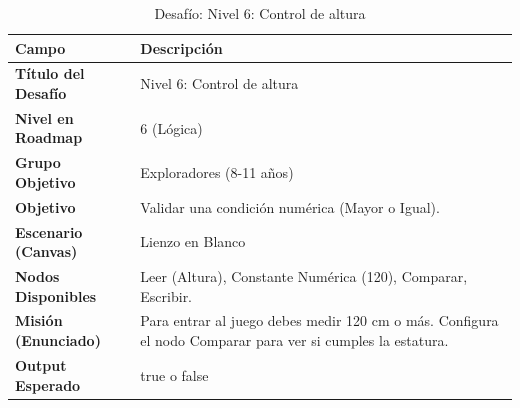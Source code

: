 \begin{table}[H]
    \centering
    \caption{Desafío: Nivel 6: Control de altura}
    \label{tab:desafio-exp-6}
    \begingroup
    \renewcommand{\arraystretch}{\TableRowStretch}
    \begin{tabularx}{\textwidth}{ l X }
        \hline
        \textbf{Campo}              & \textbf{Descripción}                                                                                       \\
        \hline
        \textbf{Título del Desafío} & Nivel 6: Control de altura                                                                                 \\
        \textbf{Nivel en Roadmap}   & 6 (Lógica)                                                                                                 \\
        \textbf{Grupo Objetivo}     & Exploradores (8-11 años)                                                                                   \\
        \textbf{Objetivo}           & Validar una condición numérica (Mayor o Igual).                                                            \\
        \textbf{Escenario (Canvas)} & Lienzo en Blanco                                                                                           \\
        \textbf{Nodos Disponibles}  & Leer (Altura), Constante Numérica (120), Comparar, Escribir.                                               \\
        \textbf{Misión (Enunciado)} & Para entrar al juego debes medir 120 cm o más. Configura el nodo Comparar para ver si cumples la estatura. \\
        \textbf{Output Esperado}    & true o false                                                                                               \\
        \hline
    \end{tabularx}
    \endgroup
\end{table}

